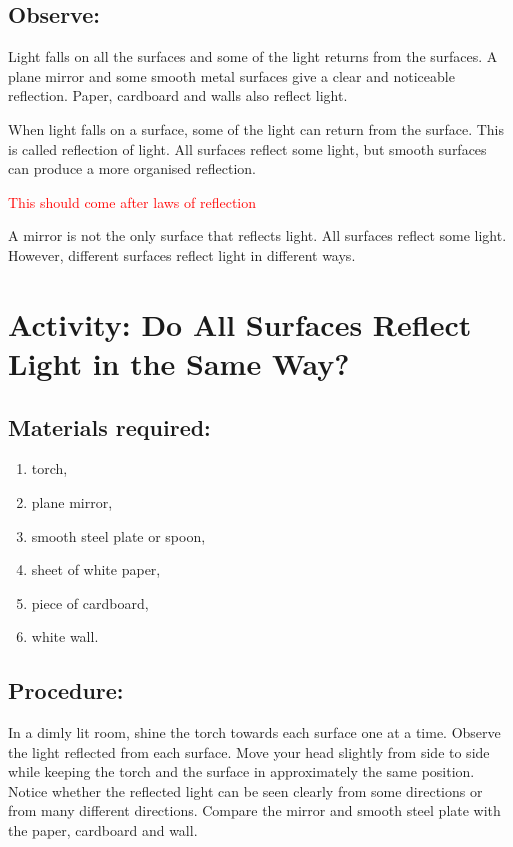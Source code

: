 \documentclass{xtufte-handout}
\begin{document}
\subsection{Observe:} Light falls on all the surfaces and some of the light returns from the surfaces. A plane mirror and some smooth metal surfaces give a clear and noticeable reflection. Paper, cardboard and walls also reflect light.

When light falls on a surface, some of the light can return from the surface. This is called reflection of light. All surfaces reflect some light, but smooth surfaces can produce a more organised reflection.

{\textcolor{red}{This should come after laws of reflection}}

A mirror is not the only surface that reflects light. All surfaces reflect some light. However, different surfaces reflect light in different ways.

\section{Activity: Do All Surfaces Reflect Light in the Same Way?}

\subsection{Materials required:} 
\begin{enumerate}
  \item torch, 
  \item plane mirror, 
  \item smooth steel plate or spoon, 
  \item sheet of white paper, 
  \item piece of cardboard, 
  \item white wall.
\end{enumerate}
\subsection{Procedure:}
In a dimly lit room, shine the torch towards each surface one at a time. Observe the light reflected from each surface. Move your head slightly from side to side while keeping the torch and the surface in approximately the same position. Notice whether the reflected light can be seen clearly from some directions or from many different directions. Compare the mirror and smooth steel plate with the paper, cardboard and wall.
\end{document}
